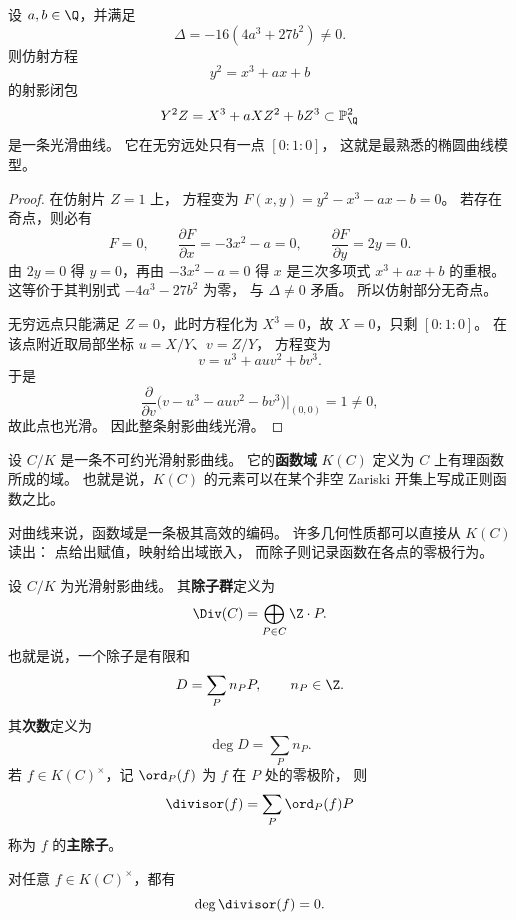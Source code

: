 \begin{example}[椭圆曲线作为平面射影曲线]
\label{ex:ch07-elliptic-projective}
设 $a,b\in \Q$，并满足
\[
  \Delta=-16(4a^3+27b^2)\neq 0.
\]
则仿射方程
\[
  y^2=x^3+ax+b
\]
的射影闭包
\[
  Y^2Z=X^3+aXZ^2+bZ^3\subset \mathbb P^2_{\Q}
\]
是一条光滑曲线。
它在无穷远处只有一点 $[0:1:0]$，
这就是最熟悉的椭圆曲线模型。
\end{example}

\begin{proof}
在仿射片 $Z=1$ 上，
方程变为 $F(x,y)=y^2-x^3-ax-b=0$。
若存在奇点，则必有
\[
  F=0,\qquad \frac{\partial F}{\partial x}=-3x^2-a=0,
  \qquad \frac{\partial F}{\partial y}=2y=0.
\]
由 $2y=0$ 得 $y=0$，再由 $-3x^2-a=0$ 得 $x$ 是三次多项式 $x^3+ax+b$ 的重根。
这等价于其判别式 $-4a^3-27b^2$ 为零，
与 $\Delta\neq 0$ 矛盾。
所以仿射部分无奇点。

无穷远点只能满足 $Z=0$，此时方程化为 $X^3=0$，故 $X=0$，只剩 $[0:1:0]$。
在该点附近取局部坐标 $u=X/Y$、$v=Z/Y$，
方程变为
\[
  v=u^3+auv^2+bv^3.
\]
于是
\[
  \frac{\partial}{\partial v}\bigl(v-u^3-auv^2-bv^3\bigr)\Big|_{(0,0)}=1\neq 0,
\]
故此点也光滑。
因此整条射影曲线光滑。
\end{proof}

\begin{definition}[函数域与有理函数]
\label{def:ch07-function-field}
设 $C/K$ 是一条不可约光滑射影曲线。
它的\textbf{函数域} $K(C)$ 定义为 $C$ 上有理函数所成的域。
也就是说，$K(C)$ 的元素可以在某个非空 Zariski 开集上写成正则函数之比。
\end{definition}

对曲线来说，函数域是一条极其高效的编码。
许多几何性质都可以直接从 $K(C)$ 读出：
点给出赋值，映射给出域嵌入，
而除子则记录函数在各点的零极行为。

\begin{definition}[除子]
\label{def:ch07-divisor}
设 $C/K$ 为光滑射影曲线。
其\textbf{除子群}定义为
\[
  \Div(C)=\bigoplus_{P\in C}\Z\cdot P.
\]
也就是说，一个除子是有限和
\[
  D=\sum_P n_P P,\qquad n_P\in\Z.
\]
其\textbf{次数}定义为
\[
  \deg D=\sum_P n_P.
\]
若 $f\in K(C)^\times$，记 $\ord_P(f)$ 为 $f$ 在 $P$ 处的零极阶，
则
\[
  \divisor(f)=\sum_P \ord_P(f)P
\]
称为 $f$ 的\textbf{主除子}。
\end{definition}

\begin{proposition}[主除子的次数为零]
\label{prop:ch07-principal-degree-zero}
对任意 $f\in K(C)^\times$，都有
\[
  \deg \divisor(f)=0.
\]
\end{proposition}

